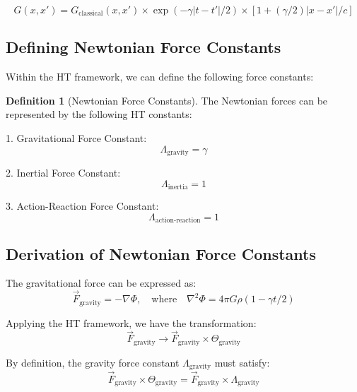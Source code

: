 \documentclass{article}
\theoremstyle{plain}
\theoremstyle{definition}
\newtheorem{definition}[theorem]{Definition}
\theoremstyle{remark}
\begin{document}
\begin{equation}
G(x,x') = G_\text{classical}(x,x') \times \exp(-\gamma|t-t'|/2) \times \left[1 + (\gamma/2)|x-x'|/c\right]
\end{equation}

\subsection{Defining Newtonian Force Constants}

Within the HT framework, we can define the following force constants:

\begin{definition}[Newtonian Force Constants]
The Newtonian forces can be represented by the following HT constants:

1. Gravitational Force Constant:
   \begin{equation}
   \Lambda_\text{gravity} = \gamma
   \end{equation}

2. Inertial Force Constant:
   \begin{equation}
   \Lambda_\text{inertia} = 1
   \end{equation}

3. Action-Reaction Force Constant:
   \begin{equation}
   \Lambda_\text{action-reaction} = 1
   \end{equation}
\end{definition}

\subsection{Derivation of Newtonian Force Constants}

The gravitational force can be expressed as:
\begin{equation}
\vec{F}_\text{gravity} = -\nabla \Phi, \quad \text{where} \quad \nabla^2 \Phi = 4\pi G \rho(1 - \gamma t/2)
\end{equation}

Applying the HT framework, we have the transformation:
\begin{equation}
\vec{F}_\text{gravity} \rightarrow \vec{F}_\text{gravity} \times \Theta_{\text{gravity}}
\end{equation}

By definition, the gravity force constant $\Lambda_\text{gravity}$ must satisfy:
\begin{equation}
\vec{F}_\text{gravity} \times \Theta_{\text{gravity}} = \vec{F}_\text{gravity} \times \Lambda_\text{gravity}
\end{equation}
\end{document}
